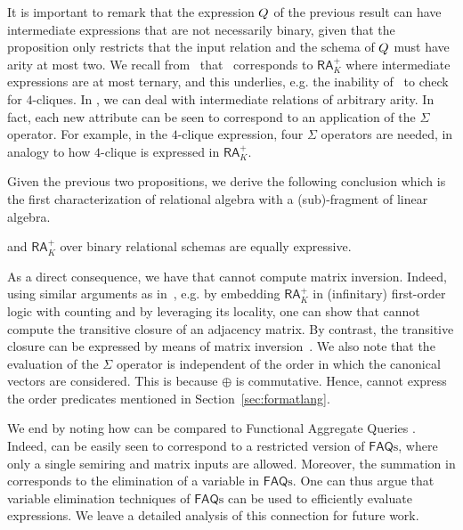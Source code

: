 

It is important to remark that the expression $Q$ of the previous result can have intermediate expressions that are not necessarily binary, given that the proposition only restricts that the input relation and the schema of $Q$ must have arity at most two. We recall from~\cite{brijder2019matrices} that \lang\ corresponds to $\mathsf{RA}_{K}^+$ where intermediate expressions are at most ternary, and this underlies, e.g. the inability of \lang\ to check for $4$-cliques. In \langsum, we can deal with intermediate relations of arbitrary arity. In fact, each new attribute can be seen to correspond to an application of the $\Sigma$ operator. For example, in the $4$-clique expression, four $\Sigma$ operators are needed, in analogy to how
$4$-clique is expressed in $\mathsf{RA}_{K}^+$.

Given the previous two propositions, we derive the following conclusion which is the first characterization of relational algebra with a (sub)-fragment of linear algebra.
\begin{corollary}
	\langsum and $\mathsf{RA}_{K}^+$  over binary relational schemas are equally expressive. 
\end{corollary}

As a direct consequence, we have that \langsum cannot compute matrix inversion. Indeed, using similar arguments as
in~\cite{matlang-journal}, e.g. by embedding $\mathsf{RA}_{K}^+$  in (infinitary) first-order logic with counting and by leveraging its locality, one can show that \langsum cannot compute the transitive closure of an adjacency matrix. By contrast, the transitive closure can be expressed by means of matrix inversion~\cite{matlang-journal}. We also note that the evaluation of the $\Sigma$ operator is
independent of the order in which the canonical vectors are considered. This is because $\oplus$ is commutative.
Hence, \langsum cannot express the order predicates mentioned in Section~\ref{sec:formatlang}.

We end by noting how \langsum can be compared to Functional Aggregate Queries \cite{FAQAI,FAQ}. Indeed, \langsum can be easily seen to correspond to a restricted version of $\mathsf{FAQ}\text{s}$, where only a single semiring and matrix inputs are allowed. Moreover, the summation in \langsum corresponds to the elimination of a variable in $\mathsf{FAQ}\text{s}$. One can thus argue that  variable elimination techniques of $\mathsf{FAQ}\text{s}$ \cite{FAQ} can be used to efficiently evaluate \langsum expressions. We leave a detailed analysis of this connection for future work.




